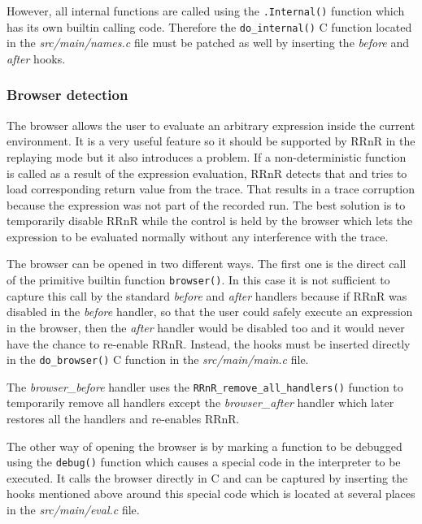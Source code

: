 \documentclass[thesis=M,english,hidelinks]{FITthesis}[2012/10/20]
\begin{document}
			However, all internal functions are called using the \lstinline|.Internal()| function which has its own builtin calling code. Therefore the \lstinline|do_internal()| C function located in the \emph{src/main/names.c} file must be patched as well by inserting the \emph{before} and \emph{after} hooks.\par
			
			\subsubsection{Browser detection}
			The browser allows the user to evaluate an arbitrary expression inside the current environment. It is a very useful feature so it should be supported by RRnR in the replaying mode but it also introduces a problem. If a non-deterministic function is called as a result of the expression evaluation, RRnR detects that and tries to load corresponding return value from the trace. That results in a trace corruption because the expression was not part of the recorded run. The best solution is to temporarily disable RRnR while the control is held by the browser which lets the expression to be evaluated normally without any interference with the trace.\par
			
			The browser can be opened in two different ways. The first one is the direct call of the primitive builtin function \lstinline|browser()|. In this case it is not sufficient to capture this call by the standard \emph{before} and \emph{after} handlers because if RRnR was disabled in the \emph{before} handler, so that the user could safely execute an expression in the browser, then the \emph{after} handler would be disabled too and it would never have the chance to re-enable RRnR. Instead, the hooks must be inserted directly in the \lstinline|do_browser()| C function in the \emph{src/main/main.c} file.\par
			
			The \emph{browser\_before} handler uses the \lstinline|RRnR_remove_all_handlers()| function to temporarily remove all handlers except the \emph{browser\_after} handler which later restores all the handlers and re-enables RRnR.\par
			
			The other way of opening the browser is by marking a function to be debugged using the \lstinline|debug()| function which causes a special code in the interpreter to be executed. It calls the browser directly in C and can be captured by inserting the hooks mentioned above around this special code which is located at several places in the \emph{src/main/eval.c} file.\par
			
\end{document}
